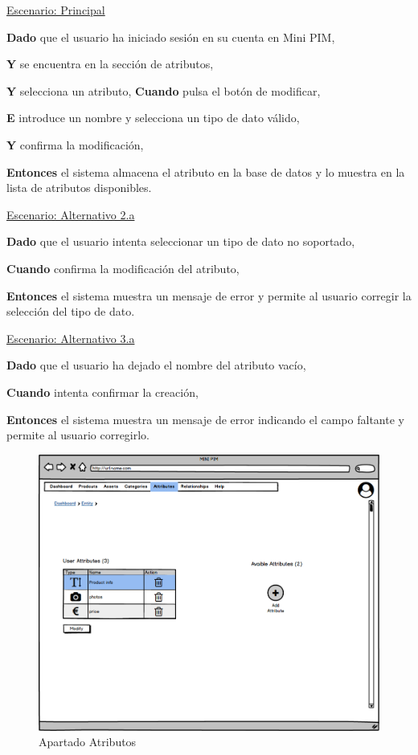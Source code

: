 \underline{Escenario: Principal}\par
\vspace{0.15cm}
\textbf{Dado} que el usuario ha iniciado sesión en su cuenta en Mini PIM,\par
\textbf{Y} se encuentra en la sección de atributos,\par
\textbf{Y} selecciona un atributo,
\textbf{Cuando} pulsa el botón de modificar,\par
\textbf{E} introduce un nombre y selecciona un tipo de dato válido,\par
\textbf{Y} confirma la modificación,\par
\textbf{Entonces} el sistema almacena el atributo en la base de datos y lo muestra en la lista de atributos disponibles.\par
\vspace{0.20cm}

\underline{Escenario: Alternativo 2.a}\par
\vspace{0.15cm}
\textbf{Dado} que el usuario intenta seleccionar un tipo de dato no soportado,\par
\textbf{Cuando} confirma la modificación del atributo,\par
\textbf{Entonces} el sistema muestra un mensaje de error y permite al usuario corregir la selección del tipo de dato.\par
\vspace{0.20cm}

\underline{Escenario: Alternativo 3.a}\par
\vspace{0.15cm}
\textbf{Dado} que el usuario ha dejado el nombre del atributo vacío,\par
\textbf{Cuando} intenta confirmar la creación,\par
\textbf{Entonces} el sistema muestra un mensaje de error indicando el campo faltante y permite al usuario corregirlo.\par
\vspace{0.20cm}


\begin{figure}[H]
    \includegraphics[width=1\linewidth]{mockups/RF6.3Modificar_Atributo.png}
    \caption{Apartado Atributos}
   \end{figure}
\vspace{1.0cm}

\newpage %